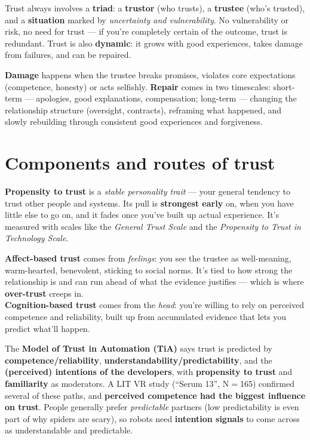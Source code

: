\documentclass[11pt, oneside]{book}
\begin{document}
Trust always involves a \textbf{triad}: a \textbf{trustor} (who trusts), a
\textbf{trustee} (who's trusted), and a \textbf{situation} marked by
\emph{uncertainty and vulnerability}. No vulnerability or risk, no need for
trust — if you're completely certain of the outcome, trust is redundant. Trust
is also \textbf{dynamic}: it grows with good experiences, takes damage from
failures, and can be repaired.

\textbf{Damage} happens when the trustee breaks promises, violates core
expectations (competence, honesty) or acts selfishly. \textbf{Repair} comes in
two timescales: short-term — apologies, good explanations, compensation;
long-term — changing the relationship structure (oversight, contracts),
reframing what happened, and slowly rebuilding through consistent good
experiences and forgiveness.

\section{Components and routes of trust}

\textbf{Propensity to trust} is a \emph{stable personality trait} — your
general tendency to trust other people and systems. Its pull is
\textbf{strongest early} on, when you have little else to go on, and it fades
once you've built up actual experience. It's measured with scales like the
\emph{General Trust Scale} and the \emph{Propensity to Trust in Technology
Scale}.

\begin{thmbox}[title={Two routes to trust}]
\textbf{Affect-based trust} comes from \emph{feelings}: you see the trustee as
well-meaning, warm-hearted, benevolent, sticking to social norms. It's tied to
how strong the relationship is and can run ahead of what the evidence justifies
— which is where \textbf{over-trust} creeps in.\\
\textbf{Cognition-based trust} comes from the \emph{head}: you're willing to
rely on perceived competence and reliability, built up from accumulated
evidence that lets you predict what'll happen.
\end{thmbox}

The \textbf{Model of Trust in Automation (TiA)} says trust is predicted by
\textbf{competence/reliability}, \textbf{understandability/predictability}, and
the \textbf{(perceived) intentions of the developers}, with \textbf{propensity
to trust} and \textbf{familiarity} as moderators. A LIT VR study (``Serum
13'', N$=$165) confirmed several of these paths, and \textbf{perceived
competence had the biggest influence on trust}. People generally prefer
\emph{predictable} partners (low predictability is even part of why spiders
are scary), so robots need \textbf{intention signals} to come across as
understandable and predictable.
\end{document}
